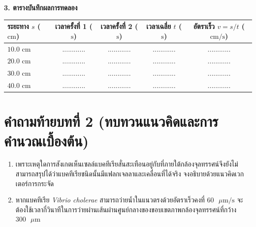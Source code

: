\begin{labbox}
\noindent\textbf{3. ตารางบันทึกผลการทดลอง}
\begin{center}
\footnotesize\setlength{\tabcolsep}{3.5pt}
\begin{tabularx}{\linewidth}{>{\raggedright\arraybackslash}X c c c c}
\toprule
\textbf{ระยะทาง $s$ ($\text{cm}$)} & \textbf{เวลาครั้งที่ 1 ($\text{s}$)} & \textbf{เวลาครั้งที่ 2 ($\text{s}$)} & \textbf{เวลาเฉลี่ย $t$ ($\text{s}$)} & \textbf{อัตราเร็ว $v = s/t$ ($\text{cm/s}$)} \\
\midrule
$10.0\text{ cm}$ & ............ & ............ & ............ & ............ \\
$20.0\text{ cm}$ & ............ & ............ & ............ & ............ \\
$30.0\text{ cm}$ & ............ & ............ & ............ & ............ \\
$40.0\text{ cm}$ & ............ & ............ & ............ & ............ \\
\bottomrule
\end{tabularx}
\end{center}
\end{labbox}

\section*{คำถามท้ายบทที่ 2 (ทบทวนแนวคิดและการคำนวณเบื้องต้น)}
\begin{enumerate}
    \item เพราะเหตุใดการสังเกตเห็นเซลล์แบคทีเรียสั่นสะเทือนอยู่กับที่ภายใต้กล้องจุลทรรศน์จึงยังไม่สามารถสรุปได้ว่าแบคทีเรียชนิดนั้นมีแฟลกเจลลาและเคลื่อนที่ได้จริง จงอธิบายด้วยแนวคิดเวกเตอร์การกระจัด
    \item หากแบคทีเรีย \textit{Vibrio cholerae} สามารถว่ายน้ำในแนวตรงด้วยอัตราเร็วคงที่ $60\text{ }\mu\text{m/s}$ จะต้องใช้เวลากี่วินาทีในการว่ายผ่านเส้นผ่านศูนย์กลางของขอบเขตภาพกล้องจุลทรรศน์ที่กว้าง $300\text{ }\mu\text{m}$
\end{enumerate}
